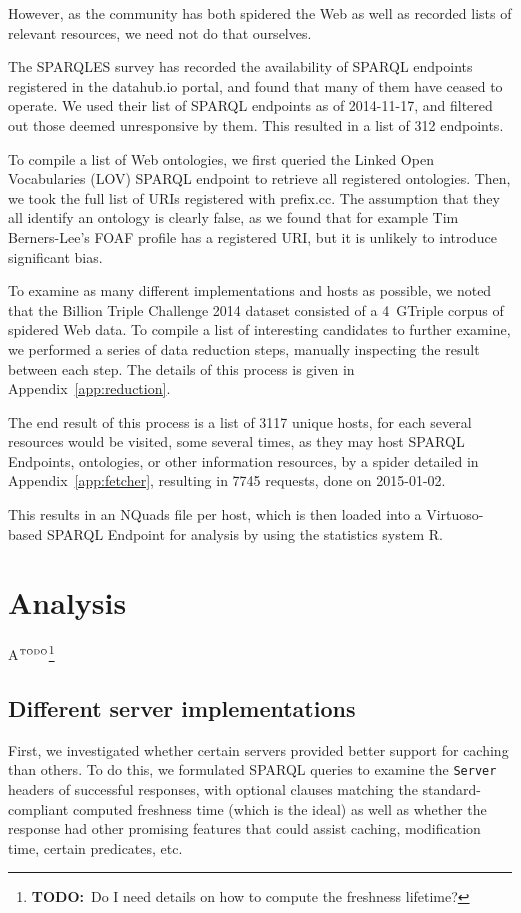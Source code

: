 \documentclass{llncs}
\newcommand{\httph}[1]{\texttt{#1}}
\newcommand{\todo}[1]{\ensuremath{^{\textrm{\tiny{TODO}\normalsize}}}\footnote{\textbf{TODO:}~#1}}
\begin{document}
However, as the community has both spidered the Web as well as
recorded lists of relevant resources, we need not do that ourselves. 

The SPARQLES survey\cite{buil2013sparql} has recorded the availability
of SPARQL endpoints registered in the datahub.io portal, and found
that many of them have ceased to operate. We used their list of SPARQL
endpoints as of 2014-11-17, and filtered out those deemed unresponsive
by them. This resulted in a list of 312 endpoints.

To compile a list of Web ontologies, we first queried the Linked Open
Vocabularies (LOV) \cite{lov2} SPARQL endpoint
to retrieve all registered ontologies. Then, we took the full list of
URIs registered with prefix.cc. The assumption that they all identify
an ontology is clearly false, as we found that for example Tim
Berners-Lee's FOAF profile has a registered URI, but it is unlikely to
introduce significant bias.

To examine as many different implementations and hosts as possible, we
noted that the Billion Triple Challenge 2014 \cite{btc-2014} dataset
consisted of a 4~GTriple corpus of spidered Web data. To compile a
list of interesting candidates to further examine, we performed a
series of data reduction steps, manually inspecting the result between
each step. The details of this process is given in
Appendix~\ref{app:reduction}.

The end result of this process is a list of 3117 unique hosts, for
each several resources would be visited, some several times, as they
may host SPARQL Endpoints, ontologies, or other information resources,
by a spider detailed in Appendix~\ref{app:fetcher}, resulting in 7745
requests, done on 2015-01-02.

This results in an NQuads file per host, which is then loaded into a
Virtuoso-based SPARQL Endpoint for analysis by using the statistics
system R\cite{kn:r}.

\section{Analysis}

A\todo{Do I need details on how to compute the freshness lifetime?}

\subsection{Different server implementations}

First, we investigated whether certain servers provided better support
for caching than others. To do this, we formulated SPARQL queries to
examine the \httph{Server} headers of successful responses, with
optional clauses matching the standard-compliant computed freshness
time (which is the ideal) as well as whether the response had other
promising features that could assist caching, modification time,
certain predicates, etc.
\end{document}
